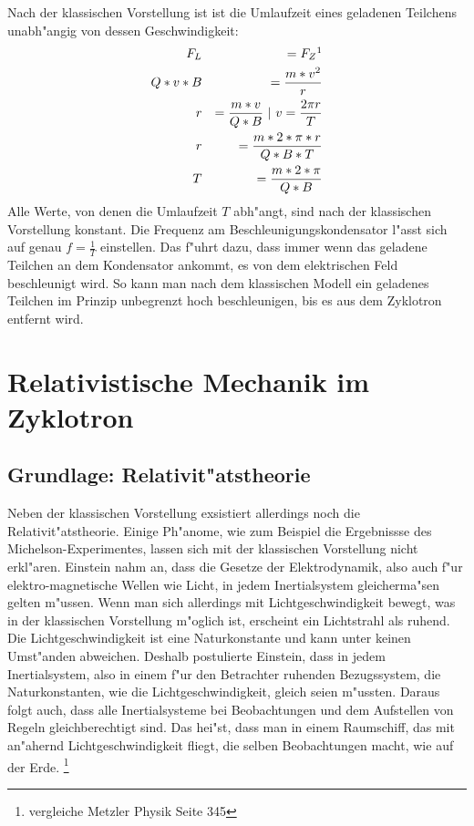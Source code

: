 \documentclass[14pt, a4paper]{report}
\begin{document}
Nach der klassischen Vorstellung ist ist die Umlaufzeit eines geladenen Teilchens 
unabh"angig von dessen Geschwindigkeit:
\begin{eqnarray}
  F_L  		&& = F_Z  \footnotemark  \\
  Q * v * B 	&& = \frac{m * v^2}{r} \label{Radius im Zyklotron}\\
  r		&& = \frac{m * v}{Q * B}  ~ | ~ v = \frac{2\pi r}{T} \\
  r		&& = \frac{m * 2 * \pi * r}{Q * B * T} \\
  T		&& = \frac{m * 2 * \pi }{Q * B} \label{klassische_Umlaufzeit}
\end{eqnarray}
Alle Werte, von denen die Umlaufzeit $T$ abh"angt, 
sind nach der klassischen Vorstellung konstant. 
Die Frequenz am Beschleunigungskondensator l"asst sich auf genau $f = \frac{1}{T}$
einstellen. Das f"uhrt dazu, dass immer wenn das geladene Teilchen an dem Kondensator 
ankommt, es von dem elektrischen Feld beschleunigt wird. So kann man nach dem klassischen Modell
ein geladenes Teilchen im Prinzip unbegrenzt hoch beschleunigen, bis es aus dem
Zyklotron entfernt wird. \label{klassische_Erwartung}

\chapter{Relativistische Mechanik im Zyklotron}
\section{Grundlage: Relativit"atstheorie}
Neben der klassischen Vorstellung exsistiert allerdings noch die 
Relativit"atstheorie. Einige Ph"anome, wie zum Beispiel die Ergebnissse 
des Michelson-Experimentes,
lassen sich mit der klassischen Vorstellung nicht erkl"aren. Einstein nahm an, dass 
die Gesetze der Elektrodynamik, also auch f"ur elektro-magnetische Wellen wie Licht,
in jedem Inertialsystem gleicherma"sen gelten m"ussen. 
Wenn man sich allerdings mit Lichtgeschwindigkeit bewegt, was in der klassischen Vorstellung 
m"oglich ist, erscheint ein Lichtstrahl als ruhend. 
Die Lichtgeschwindigkeit ist eine Naturkonstante und kann unter keinen 
Umst"anden abweichen. Deshalb postulierte Einstein, dass in jedem Inertialsystem, also in
einem f"ur den Betrachter ruhenden Bezugssystem, die 
Naturkonstanten, wie die Lichtgeschwindigkeit, gleich seien m"ussten. Daraus folgt auch,
dass alle Inertialsysteme bei Beobachtungen und dem Aufstellen von Regeln gleichberechtigt sind. 
Das hei"st, dass man in einem Raumschiff, das mit an"ahernd Lichtgeschwindigkeit
fliegt, die selben Beobachtungen macht, wie auf der Erde.
\footnote{vergleiche Metzler Physik Seite 345}
\end{document}
